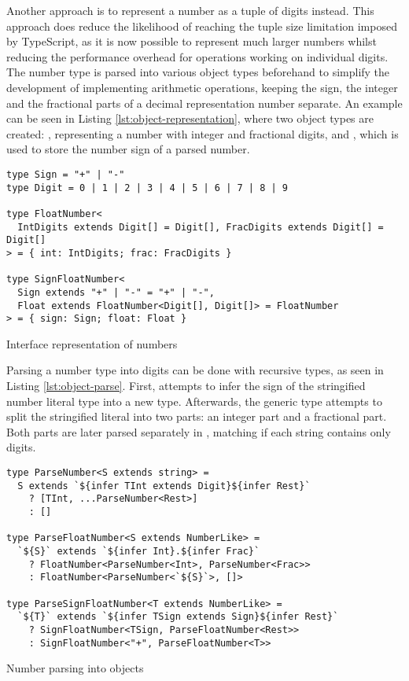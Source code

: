 Another approach is to represent a number as a tuple of digits instead. This approach does reduce the likelihood of reaching the tuple size limitation imposed by TypeScript, as it is now possible to represent much larger numbers whilst reducing the performance overhead for operations working on individual digits. The number type is parsed into various object types beforehand to simplify the development of implementing arithmetic operations, keeping the sign, the integer and the fractional parts of a decimal representation number separate. An example can be seen in Listing \ref{lst:object-representation}, where two object types are created: , representing a number with integer and fractional digits, and , which is used to store the number sign of a parsed number.

\begin{listing}[ht]
  \begin{verbatim}
type Sign = "+" | "-"
type Digit = 0 | 1 | 2 | 3 | 4 | 5 | 6 | 7 | 8 | 9

type FloatNumber<
  IntDigits extends Digit[] = Digit[], FracDigits extends Digit[] = Digit[]
> = { int: IntDigits; frac: FracDigits }

type SignFloatNumber<
  Sign extends "+" | "-" = "+" | "-",
  Float extends FloatNumber<Digit[], Digit[]> = FloatNumber
> = { sign: Sign; float: Float }
\end{verbatim}
  \caption{Interface representation of numbers}\label{lst:object-representation}
\end{listing}

Parsing a number type into digits can be done with recursive types, as seen in Listing \ref{lst:object-parse}. First,  attempts to infer the sign of the stringified number literal type into a new  type. Afterwards, the  generic type attempts to split the stringified literal into two parts: an integer part and a fractional part. Both parts are later parsed separately in , matching if each string contains only digits.

\begin{listing}[ht]
  \begin{verbatim}
type ParseNumber<S extends string> =
  S extends `${infer TInt extends Digit}${infer Rest}`
    ? [TInt, ...ParseNumber<Rest>]
    : []

type ParseFloatNumber<S extends NumberLike> =
  `${S}` extends `${infer Int}.${infer Frac}`
    ? FloatNumber<ParseNumber<Int>, ParseNumber<Frac>>
    : FloatNumber<ParseNumber<`${S}`>, []>

type ParseSignFloatNumber<T extends NumberLike> =
  `${T}` extends `${infer TSign extends Sign}${infer Rest}`
    ? SignFloatNumber<TSign, ParseFloatNumber<Rest>>
    : SignFloatNumber<"+", ParseFloatNumber<T>>
\end{verbatim}
  \caption{Number parsing into objects}\label{lst:object-parse}
\end{listing}

